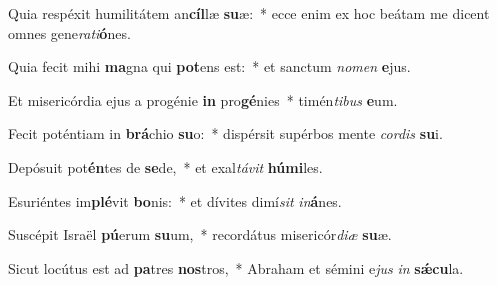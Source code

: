 \item Quia respéxit humilitátem an\textbf{cíl}læ \textbf{su}æ:~* ecce enim ex hoc beátam me dicent omnes gene\textit{ra}\textit{ti}\textbf{ó}nes.
\item Quia fecit mihi \textbf{ma}gna qui \textbf{pot}ens est:~* et sanctum \textit{no}\textit{men} \textbf{e}jus.
\item Et misericórdia ejus a progénie \textbf{in} pro\textbf{gé}nies~* timén\textit{ti}\textit{bus} \textbf{e}um.
\item Fecit poténtiam in \textbf{brá}chio \textbf{su}o:~* dispérsit supérbos mente \textit{cor}\textit{dis} \textbf{su}i.
\item Depósuit pot\textbf{én}tes de \textbf{se}de,~* et exal\textit{tá}\textit{vit} \textbf{hú}\textbf{mi}les.
\item Esuriéntes im\textbf{plé}vit \textbf{bo}nis:~* et dívites dimí\textit{sit} \textit{in}\textbf{á}nes.
\item Suscépit Israël \textbf{pú}erum \textbf{su}um,~* recordátus misericór\textit{di}\textit{æ} \textbf{su}æ.
\item Sicut locútus est ad \textbf{pa}tres \textbf{nos}tros,~* Abraham et sémini e\textit{jus} \textit{in} \textbf{sǽ}\textbf{cu}la.
